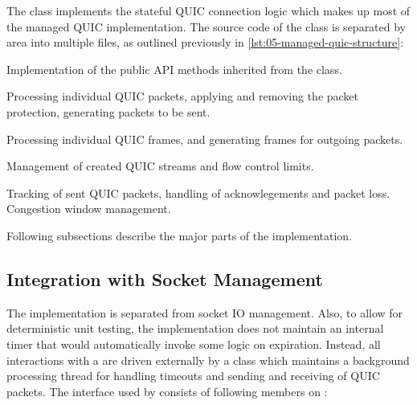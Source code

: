 The \ManagedQuicConnection{} class implements the stateful QUIC connection logic which makes up most
of the managed QUIC implementation. The source code of the \ManagedQuicConnection{} class is
separated by area into multiple files, as outlined previously in
\autoref{lst:05-managed-quic-structure}:

\begin{itemize}

   Implementation of the public API methods inherited from the \QuicConnectionProvider{} class.

   Processing individual QUIC packets, applying and removing the packet protection, generating packets to be sent.

   Processing individual QUIC frames, and generating frames for outgoing packets.

   Management of created QUIC streams and flow control limits.

   Tracking of sent QUIC packets, handling of acknowlegements and packet loss. Congestion window management.

\end{itemize}

Following subsections describe the major parts of the implementation.

\subsection{Integration with Socket Management}

The \ManagedQuicConnection{} implementation is separated from socket IO management. Also, to allow
for deterministic unit testing, the implementation does not maintain an internal timer that would
automatically invoke some logic on expiration. Instead, all interactions with a \Socket{} are driven
externally by a \QuicConnectionContext{} class which maintains a background processing thread for
handling timeouts and sending and receiving of QUIC packets. The interface used by
\QuicConnectionContext{} consists of following members on \ManagedQuicConnection{}:

